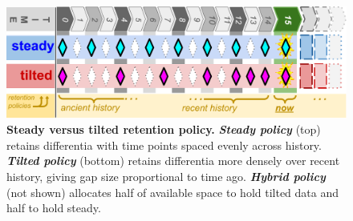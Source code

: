 \begin{figure}
  \centering
  \includegraphics[width=\linewidth]{img/steady-vs-tilted-schematic}
  \caption{%
  \textbf{Steady versus tilted retention policy.}
  \textbf{\textit{Steady policy}} (top) retains differentia with time points spaced evenly across history.
  \textbf{\textit{Tilted policy}} (bottom) retains differentia more densely over recent history, giving gap size proportional to time ago.
  \textbf{\textit{Hybrid policy}} (not shown) allocates half of available space to hold tilted data and half to hold steady.
  }
  \label{fig:steady-vs-tilted-schematic}
\end{figure}
